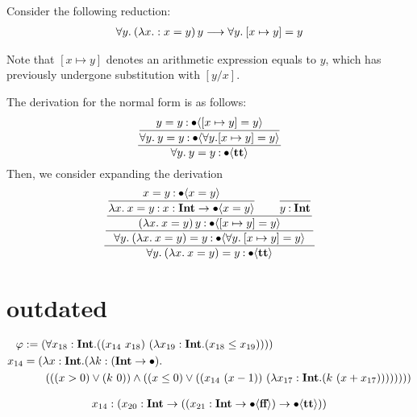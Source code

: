 \documentclass{article}
\begin{document}
Consider the following reduction:
\begin{align*}
    \forall y.\: (\lambda x.: x = y)\, y 
    \longrightarrow \forall y.\: [x \mapsto y] = y
\end{align*}

Note that \( [x \mapsto y ] \) denotes an arithmetic expression equals to \( y \), which has previously undergone substitution with \( [y/x] \).

The derivation for the normal form is as follows:
\begin{align*}
    \dfrac{
        \dfrac{
            y = y \mathbin{:} \bullet \langle [x \mapsto y] = y \rangle
        }{
            \forall y.\: y = y \mathbin{:} \bullet \langle \forall y. [x \mapsto y] = y \rangle
        }
    }{
        \forall y.\: y = y \mathbin{:} \bullet \langle \textbf{tt} \rangle
    }
\end{align*}
Then, we consider expanding the derivation
\begin{align*}
    \dfrac{
        \dfrac{
            \dfrac{
                \dfrac{
                    x = y \mathbin{:} \bullet \langle x = y \rangle
                }{
                    \lambda x.\: x = y \mathbin{:} {x} : \textbf{Int} \to \bullet \langle x = y \rangle
                }
                \qquad
                \dfrac{}{
                    y \mathbin{:} \textbf{Int}
                }
            }{
                (\lambda x.\: x = y)\, y \mathbin{:} \bullet \langle [x \mapsto y] = y \rangle
            }
        }{
            \forall y.\: (\lambda x.\: x = y) = y \mathbin{:} \bullet \langle \forall y.\: [x \mapsto y] = y \rangle
        }
    }{
        \forall y.\: (\lambda x.\: x = y) = y \mathbin{:} \bullet \langle \textbf{tt} \rangle
    }
\end{align*}



\section{outdated}

\begin{align*}
    \varphi &:= (\forall x_{ 18 }: \textbf{Int} . ((x_{ 14 }\  x_{ 18 } )\ (\lambda x_{ 19 }: \textbf{Int} . ( x_{ 18 }  \leq  x_{ 19 } ))))\\
    x_{ 14 } &=
    (\lambda x: \textbf{Int} . (\lambda k: (\textbf{Int}  \to \bullet
    ). \\
    &\qquad ((( x  >  0 )\lor (k\  0 ))\land (( x  \leq  0 )\lor ((x_{ 14 }\ ( x   -   1 ))\ (\lambda x_{ 17 }: \textbf{Int} . (k\ ( x   +   x_{ 17 } )))))))) \\
\end{align*}


\begin{align*}
x_{ 14 } &: ({ x_{ 20 } } : \textbf{Int} \to (({ x_{ 21 } } : \textbf{Int} \to \bullet \langle  \textbf{ff}  \rangle)\to \bullet \langle  \textbf{tt}  \rangle))\\
\end{align*}
\end{document}

